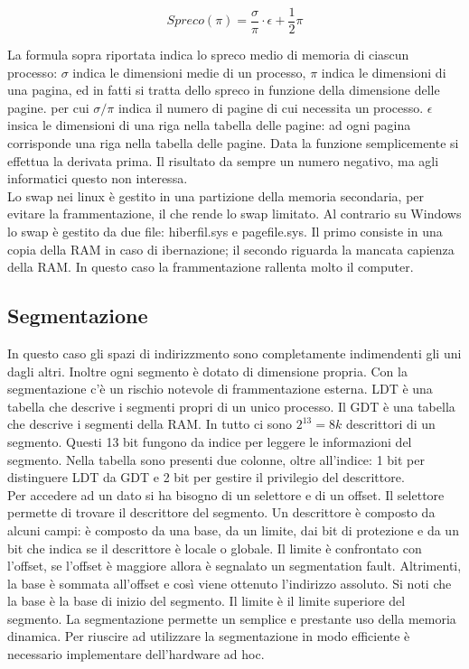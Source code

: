 \documentclass{article}
\begin{document}
\begin{equation}
	Spreco(\pi) = \frac{\sigma}{\pi}\cdot \epsilon + \frac{1}{2}\pi
\end{equation}

La formula sopra riportata indica lo spreco medio di memoria di ciascun processo: $\sigma$ indica le dimensioni medie di un processo, $\pi$ indica le dimensioni di una pagina, ed in fatti si tratta dello spreco in funzione della dimensione delle pagine. per cui $\sigma / \pi$ indica il numero di pagine di cui necessita un processo. $\epsilon$ insica le dimensioni di una riga nella tabella delle pagine: ad ogni pagina corrisponde una riga nella tabella delle pagine. Data la funzione semplicemente si effettua la derivata prima.
Il risultato da sempre un numero negativo, ma agli informatici questo non interessa.\\

Lo swap nei linux è gestito in una partizione della memoria secondaria, per evitare la frammentazione, il che rende lo swap limitato. Al contrario su Windows lo swap è gestito da due file: hiberfil.sys e pagefile.sys. Il primo consiste in una copia della RAM in caso di ibernazione; il secondo riguarda la mancata capienza della RAM. In questo caso la frammentazione rallenta molto il computer.

\subsection{Segmentazione}
In questo caso gli spazi di indirizzmento sono completamente indimendenti gli uni dagli altri. Inoltre ogni segmento è dotato di dimensione propria. Con la segmentazione c'è un rischio notevole di frammentazione esterna. LDT è una tabella che descrive i segmenti propri di un unico processo. Il GDT è una tabella che descrive i segmenti della RAM. In tutto ci sono $2^{13} = 8k$ descrittori di un segmento. Questi 13 bit fungono da indice per leggere le informazioni del segmento. Nella tabella sono presenti due colonne, oltre all'indice: 1 bit per distinguere LDT da GDT e 2 bit per gestire il privilegio del descrittore.\\
Per accedere ad un dato si ha bisogno di un selettore e di un offset. Il selettore permette di trovare il descrittore del segmento. Un descrittore è composto da alcuni campi: è composto da una base, da un limite, dai bit di protezione e da un bit che indica se il descrittore è locale o globale. Il limite è confrontato con l'offset, se l'offset è maggiore allora è segnalato un segmentation fault. Altrimenti, la base è sommata all'offset e così viene ottenuto l'indirizzo assoluto. Si noti che la base è la base di inizio del segmento. Il limite è il limite superiore del segmento. La segmentazione permette un semplice e prestante uso della memoria dinamica. Per riuscire ad utilizzare la segmentazione in modo efficiente è necessario implementare dell'hardware ad hoc. 
\end{document}
